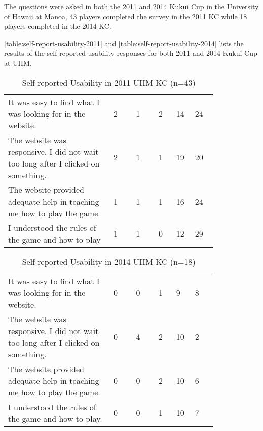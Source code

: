 The questions were asked in both the 2011 and 2014 Kukui Cup in the University of Hawaii at Manoa, 43 players completed the survey in the 2011 KC while 18 players completed in the 2014 KC.  

\autoref{table:self-report-usability-2011}  and \autoref{table:self-report-usability-2014}  lists the results of the self-reported usability responses for both 2011 and 2014 Kukui Cup at UHM.

\begin{table}[ht!]
  \centering
  \begin{tabular} {|p{0.42\linewidth}|P{0.09\linewidth}|p{0.09\linewidth}|p{0.075\linewidth}|p{0.06\linewidth}|P{0.09\linewidth}|}
    \hline
    \centering {} &  &  &  &  & \\
    \hline
It was easy to find what I was looking for in the website.& 2 & 1 & 2 & 14 & 24 \\
    \hline
The website was responsive. I did not wait too long after I clicked on something.& 2 & 1 & 1& 19 & 20 \\
    \hline
The website provided adequate help in teaching me how to play the game.	 & 1 & 1 & 1 & 16 & 24\\
    \hline
I understood the rules of the game and how to play	& 1& 1 & 0 & 12 & 29\\
    \hline 
  \end{tabular}
  \caption{Self-reported Usability in 2011 UHM KC (n=43)}
  \label{table:self-report-usability-2011}
\end{table}

\begin{table}[ht!]
  \centering
  \begin{tabular} {|p{0.42\linewidth}|P{0.09\linewidth}|p{0.09\linewidth}|p{0.075\linewidth}|p{0.06\linewidth}|P{0.09\linewidth}|}
    \hline
    \centering {} &  &  &  &  & \\
    \hline
It was easy to find what I was looking for in the website.& 0 & 0 & 1 & 9 & 8\\
    \hline
The website was responsive. I did not wait too long after I clicked on something.& 0 & 4 & 2 & 10 & 2 \\
    \hline
The website provided adequate help in teaching me how to play the game.& 0 & 0 & 2 & 10 & 6 \\
    \hline
I understood the rules of the game and how to play.& 0 & 0 & 1 & 10 & 7 \\
    \hline 
  \end{tabular}
  \caption{Self-reported Usability in 2014 UHM KC (n=18)}
  \label{table:self-report-usability-2014}
\end{table}

